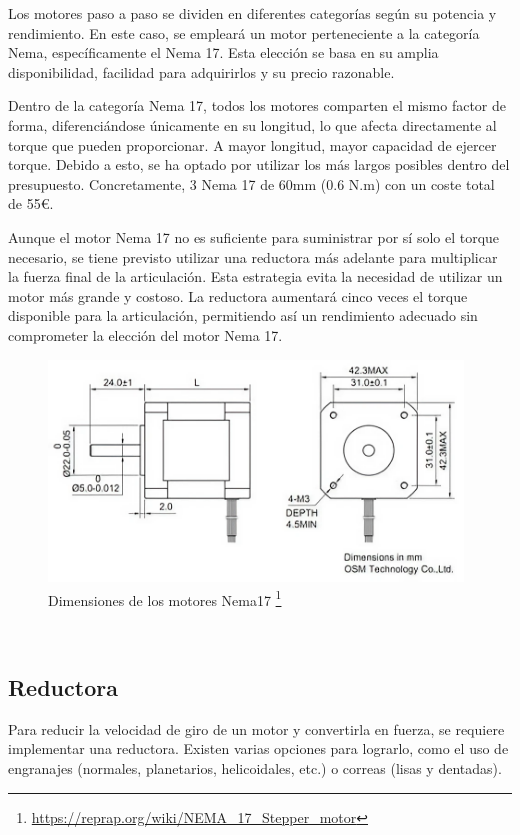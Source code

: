 Los motores paso a paso se dividen en diferentes categorías según su potencia y rendimiento. En este caso, se empleará 
un motor perteneciente a la categoría Nema, específicamente el Nema 17. Esta elección se basa en su amplia disponibilidad, facilidad 
para adquirirlos y su precio razonable.

Dentro de la categoría Nema 17, todos los motores comparten el mismo factor de forma, diferenciándose únicamente en su longitud, lo que 
afecta directamente al torque que pueden proporcionar. A mayor longitud, mayor capacidad de ejercer torque. Debido a esto, se ha optado 
por utilizar los más largos posibles dentro del presupuesto. Concretamente, 3 Nema 17 de 60mm (0.6 N.m) con un coste total de 55\euro. 

Aunque el motor Nema 17 no es suficiente para suministrar por sí solo el torque necesario, se tiene previsto utilizar una reductora más 
adelante para multiplicar la fuerza final de la articulación. Esta estrategia evita la necesidad de utilizar un motor más grande y 
costoso. La reductora aumentará cinco veces el torque disponible para la articulación, permitiendo así un rendimiento adecuado 
sin comprometer la elección del motor Nema 17.

\begin{figure} [ht!]
  \begin{center}
    \includegraphics[width=11cm]{figs/MotorsNema.png}
  \end{center}
  \caption{Dimensiones de los motores Nema17 \footnote{\url{https://reprap.org/wiki/NEMA_17_Stepper_motor}}}
  \label{fig:nema}
\end{figure}\ 

\subsection{Reductora}
\noindent Para reducir la velocidad de giro de un motor y convertirla en fuerza, se requiere implementar una 
reductora. Existen varias opciones para lograrlo, como el uso de engranajes (normales, planetarios, helicoidales, etc.) 
o correas (lisas y dentadas).

